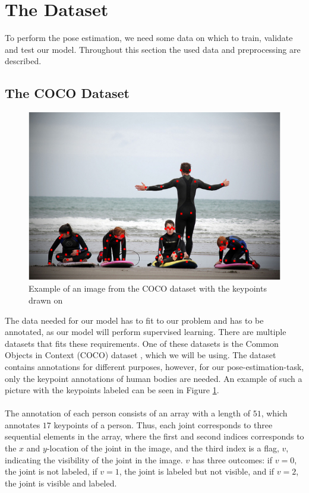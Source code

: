 \documentclass[./main.tex]{subfiles}
\begin{document}
\section{The Dataset}\label{sec:dataset}
To perform the pose estimation, we need some data on which to train, validate and test our model. Throughout this section the used data and preprocessing are described.

\subsection{The COCO Dataset}
\begin{figure}[htbp]
    \centering
    \includegraphics[height = 4 cm]{./entities/coco_example.png}
    \caption{Example of an image from the COCO dataset with the keypoints drawn on \cite{COCO_article}}
    \label{fig:coco_example}
\end{figure}
\noindent The data needed for our model has to fit to our problem and has to be annotated, as our model will perform supervised learning. There are multiple datasets that fits these requirements. One of these datasets is the Common Objects in Context (COCO) dataset \cite{COCO_article}, which we will be using. The dataset contains annotations for different purposes, however, for our pose-estimation-task, only the keypoint annotations of human bodies are needed. An example of such a picture with the keypoints labeled can be seen in Figure \ref{fig:coco_example}. 
\\
\\
The annotation of each person consists of an array with a length of $51$, which annotates $17$ keypoints of a person. Thus, each joint corresponds to three sequential elements in the array, where the first and second indices corresponds to the $x$ and $y$-location of the joint in the image, and the third index is a flag, $v$, indicating the visibility of the joint in the image. $v$ has three outcomes: if $v = 0$, the joint is not labeled, if $v = 1$, the joint is labeled but not visible, and if $v = 2$, the joint is visible and labeled. 
\end{document}
